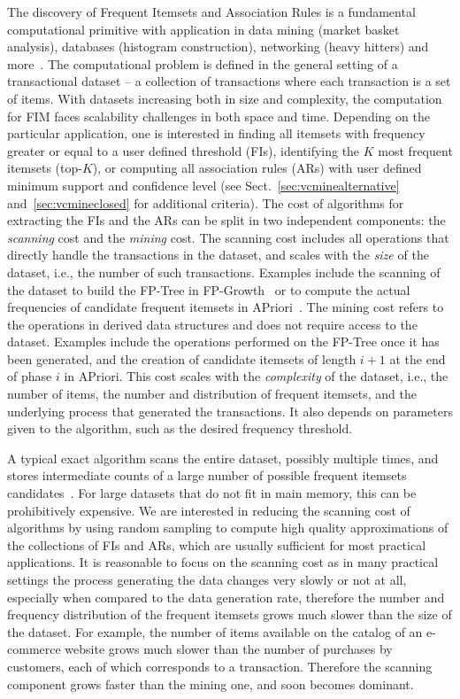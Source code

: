 The discovery of Frequent Itemsets and Association Rules is a fundamental
computational primitive with application in data mining (market basket
analysis), databases (histogram construction), networking (heavy hitters) and
more~\cite[Sect.~5]{HanCXY07}. 
The computational problem is defined in the general setting of a transactional
dataset -- a collection of transactions where each transaction is a set of
items.  With datasets increasing both in size and complexity, the computation
for FIM faces scalability challenges in both space and time. Depending on the
particular application, one is interested in finding all itemsets with frequency
greater or equal to a user defined threshold (FIs), identifying the $K$ most
frequent itemsets (top-$K$), or computing all association rules (ARs) with user
defined minimum  support and
confidence level (see Sect.~\ref{sec:vcminealternative} and~\ref{sec:vcmineclosed} for additional criteria). 
The cost of algorithms for extracting the FIs and the ARs can be split in two independent components:
the \emph{scanning} cost and the \emph{mining} cost. The scanning cost includes
all operations that directly handle the transactions in the dataset, and scales
with the \emph{size} of the dataset, i.e., the number of such transactions. Examples
include the scanning of the dataset to build the FP-Tree in
FP-Growth~\citep{HanPY00} or to compute the actual frequencies of candidate
frequent itemsets in APriori~\citep{AgrawalIS93}.  The mining cost refers to the
operations in derived data structures and does not require access to the
dataset. Examples include the operations performed on the FP-Tree once it has
been generated, and the creation of candidate itemsets of length $i+1$ at the
end of phase $i$ in APriori.  This cost scales with the \emph{complexity} of the
dataset, i.e., the number of items, the number and distribution of frequent
itemsets, and the underlying process that generated the transactions. It also
depends on parameters given to the algorithm, such as the desired frequency
threshold.

A typical exact algorithm scans the entire dataset,
possibly multiple times, and stores intermediate counts of a large number of
possible frequent itemsets candidates~\citep{AgrawalS94,HanPY00}. For large
datasets that do not fit in main memory, this can be prohibitively expensive. We
are interested in reducing the scanning cost of algorithms by using random
sampling to compute high quality approximations of the collections of FIs and
ARs, which are usually sufficient for most practical applications. It is
reasonable to focus on the scanning cost as in many practical settings
the process generating the data changes very slowly or not at all, especially
when compared to the data generation rate, therefore the number and frequency
distribution of the frequent itemsets grows much slower than the size of the
dataset. For example, the number of items available on the catalog of an
e-commerce website grows much slower than the number of purchases by customers,
each of which corresponds to a transaction.  Therefore the scanning component
grows faster than the mining one, and soon becomes dominant. 

